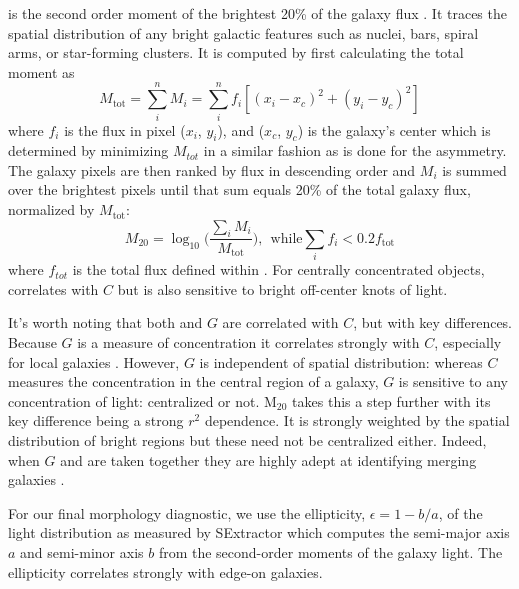  is the second order moment of the brightest 20\% of the galaxy flux \citep{Lotz2004}. It traces the spatial distribution of any bright galactic features such as nuclei, bars, spiral arms, or star-forming clusters. It is computed by first calculating the total moment as
\begin{equation}
 M_{\mathrm{tot}} = \sum_i^n M_i = \sum_i^nf_i[(x_i-x_c)^2 + (y_i-y_c)^2] 
\end{equation}
where $f_i$ is the flux in pixel ($x_i$, $y_i$), and ($x_c$, $y_c$) is the galaxy's center which is determined by minimizing $M_{tot}$ in a similar fashion as is done for the asymmetry. The galaxy pixels are then ranked by flux in descending order and $M_i$ is summed over the brightest pixels until that sum equals 20\% of the total galaxy flux, normalized by $M_{\mathrm{tot}}$:
\begin{equation}
 M_{20} = \log_{10} \Big( \frac{\sum_iM_i}{M_{\mathrm{tot}}} \Big), ~~\textrm{while} \sum_if_i < 0.2f_{\mathrm{tot}}
\end{equation}
where $f_{tot}$ is the total flux defined within \rp. For centrally concentrated objects,  correlates with $C$ but is also sensitive to bright off-center knots of light. 

It's worth noting that both  and $G$ are correlated with $C$, but with key differences. Because $G$ is a measure of concentration it correlates strongly with $C$, especially for local galaxies \citep{Abraham2003}. However, $G$ is independent of spatial distribution: whereas $C$ measures the concentration in the central region of a galaxy, $G$ is sensitive to any concentration of light: centralized or not. M$_{20}$ takes this a step further with its key difference being a strong $r^2$ dependence. It is strongly weighted by the spatial distribution of bright regions but these need not be centralized either.  Indeed, when $G$ and  are taken together they are highly adept at identifying merging galaxies \citep{Lotz2004,Lotz2008}.  


For our final morphology diagnostic, we use the ellipticity, $\epsilon = 1 - b/a$, of the light distribution as measured by SExtractor which computes the semi-major axis $a$ and semi-minor axis $b$ from the second-order moments of the galaxy light. The ellipticity correlates strongly with edge-on galaxies. 

